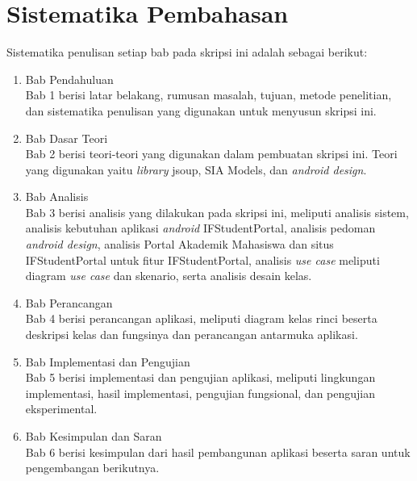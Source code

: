 \section{Sistematika Pembahasan}
\label{sec:sispem}
Sistematika penulisan setiap bab pada skripsi ini adalah sebagai berikut:

\begin{enumerate}
  \item Bab Pendahuluan \\
  Bab 1 berisi latar belakang, rumusan masalah, tujuan, metode penelitian,
  dan sistematika penulisan yang digunakan untuk menyusun skripsi ini.
  \item Bab Dasar Teori \\
  Bab 2 berisi teori-teori yang digunakan dalam pembuatan skripsi ini. Teori
  yang digunakan yaitu \textit{library} jsoup, SIA Models, dan \textit{android design}.
  \item Bab Analisis \\
  Bab 3 berisi analisis yang dilakukan pada skripsi ini, meliputi analisis sistem, analisis kebutuhan aplikasi \textit{android} IFStudentPortal, analisis pedoman \textit{android design}, analisis Portal Akademik Mahasiswa dan situs IFStudentPortal untuk fitur IFStudentPortal, analisis \textit{use case} meliputi diagram \textsl{use case} dan skenario, serta analisis desain kelas. 
  \item Bab Perancangan \\
  Bab 4 berisi perancangan aplikasi, meliputi diagram kelas rinci beserta deskripsi kelas dan fungsinya dan perancangan antarmuka aplikasi.   
  \item Bab Implementasi dan Pengujian \\
  Bab 5 berisi implementasi dan pengujian aplikasi, meliputi lingkungan implementasi, hasil implementasi, pengujian fungsional, dan pengujian eksperimental.
  \item Bab Kesimpulan dan Saran \\
  Bab 6 berisi kesimpulan dari hasil pembangunan aplikasi beserta saran untuk pengembangan berikutnya.
\end{enumerate}
